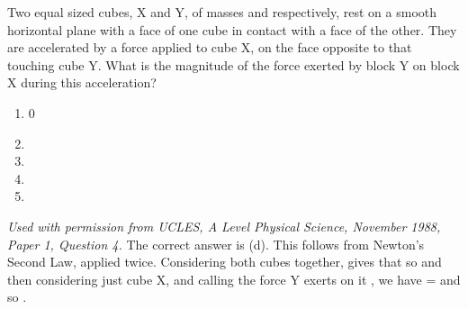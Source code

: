 
\begin{problem}  %
{Two equal sized cubes, X and Y, of masses  and  respectively, rest on a smooth horizontal plane with a face of one cube in contact with a face of the other. They are accelerated by a force  applied to cube X, on the face opposite to that touching cube Y. What is the magnitude of the force exerted by block Y on block X during this acceleration?
\begin{enumerate}
	\item 0
	\item {}
	\item {}
	\item {} \answer
	\item {}
\end{enumerate}
}
{\textit{Used with permission from UCLES, A Level Physical Science, November 1988, Paper 1, Question 4.}}
{The correct answer is (d). This follows from Newton's Second Law, applied twice. Considering both cubes together,  gives that \value{F}{(m + 2m)a}{} so  and then considering just cube X, and calling the force Y exerts on it , we have \value{(F - R)}{ma}{} =  and so .}
\end{problem}